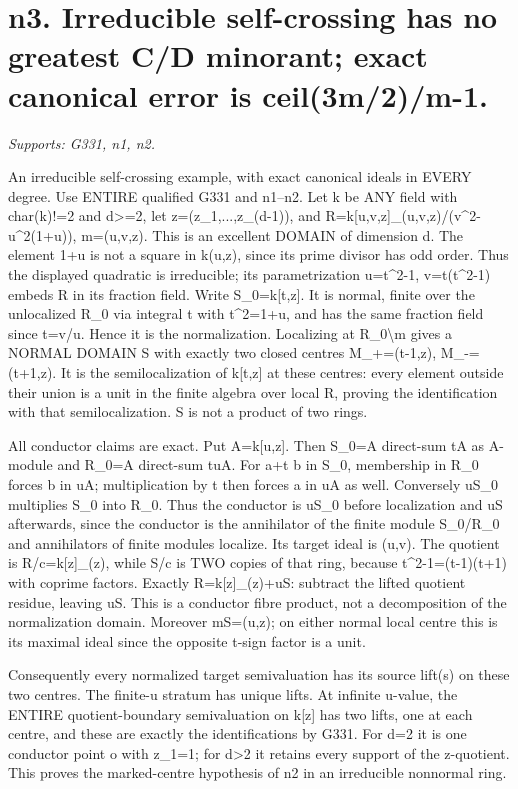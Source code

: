 \section{n3. Irreducible self-crossing has no greatest C/D minorant; exact canonical error is ceil(3m/2)/m-1.}
\textit{Supports: G331, n1, n2.}

An irreducible self-crossing example, with exact canonical ideals in EVERY degree. Use ENTIRE qualified G331 and n1--n2. Let k be ANY field with char(k)!=2 and d\textgreater{}=2, let z=(z\_1,...,z\_(d-1)), and
R=k[u,v,z]\_(u,v,z)/(v\textasciicircum{}2-u\textasciicircum{}2(1+u)), m=(u,v,z).
This is an excellent DOMAIN of dimension d. The element 1+u is not a square in k(u,z), since its prime divisor has odd order. Thus the displayed quadratic is irreducible; its parametrization u=t\textasciicircum{}2-1, v=t(t\textasciicircum{}2-1) embeds R in its fraction field. Write S\_0=k[t,z]. It is normal, finite over the unlocalized R\_0 via integral t with t\textasciicircum{}2=1+u, and has the same fraction field since t=v/u. Hence it is the normalization. Localizing at R\_0\textbackslash{}m gives a NORMAL DOMAIN S with exactly two closed centres M\_+=(t-1,z), M\_-=(t+1,z). It is the semilocalization of k[t,z] at these centres: every element outside their union is a unit in the finite algebra over local R, proving the identification with that semilocalization. S is not a product of two rings.

All conductor claims are exact. Put A=k[u,z]. Then S\_0=A direct-sum tA as A-module and R\_0=A direct-sum tuA. For a+t b in S\_0, membership in R\_0 forces b in uA; multiplication by t then forces a in uA as well. Conversely uS\_0 multiplies S\_0 into R\_0. Thus the conductor is uS\_0 before localization and uS afterwards, since the conductor is the annihilator of the finite module S\_0/R\_0 and annihilators of finite modules localize. Its target ideal is (u,v). The quotient is R/c=k[z]\_(z), while S/c is TWO copies of that ring, because t\textasciicircum{}2-1=(t-1)(t+1) with coprime factors. Exactly R=k[z]\_(z)+uS: subtract the lifted quotient residue, leaving uS. This is a conductor fibre product, not a decomposition of the normalization domain. Moreover mS=(u,z); on either normal local centre this is its maximal ideal since the opposite t-sign factor is a unit.

Consequently every normalized target semivaluation has its source lift(s) on these two centres. The finite-u stratum has unique lifts. At infinite u-value, the ENTIRE quotient-boundary semivaluation on k[z] has two lifts, one at each centre, and these are exactly the identifications by G331. For d=2 it is one conductor point o with z\_1=1; for d\textgreater{}2 it retains every support of the z-quotient. This proves the marked-centre hypothesis of n2 in an irreducible nonnormal ring.

